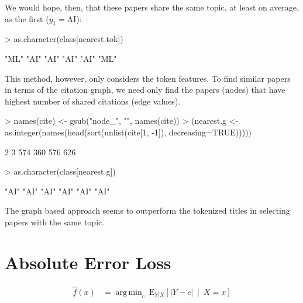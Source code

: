 \documentclass[a4paper]{article}
\DeclareMathOperator*{\argmin}{arg\,min}
\begin{document}
We would hope, then, that these papers share the same topic, at least on average,
as the first ($y_1=$AI):
\begin{Schunk}
\begin{Sinput}
> as.character(class[nearest.tok])
\end{Sinput}
\begin{Soutput}
[1] "ML" "AI" "AI" "AI" "AI" "ML"
\end{Soutput}
\end{Schunk}
This method, however,  only considers the token features.  To find similar papers in terms of
the citation graph, we need only find the papers (nodes) that have
highest number of shared citations (edge values).
\begin{Schunk}
\begin{Sinput}
> names(cite) <- gsub("node_", "", names(cite))
> (nearest.g <- as.integer(names(head(sort(unlist(cite[1, -1]), decreasing=TRUE)))))
\end{Sinput}
\begin{Soutput}
[1]   2   3 574 360 576 626
\end{Soutput}
\begin{Sinput}
> as.character(class[nearest.g])
\end{Sinput}
\begin{Soutput}
[1] "AI" "AI" "AI" "AI" "AI" "AI"
\end{Soutput}
\end{Schunk}
The graph based approach seems to outperform the tokenized titles in selecting papers
with the same topic.

\section{Absolute Error Loss}
\begin{align*}
  \hat{f}(x) &= \argmin_c \: \text{E}_{Y|X}\left[\lvert Y - c \rvert \:\middle|\: X=x\right]\\
\end{align*}
\end{document}
